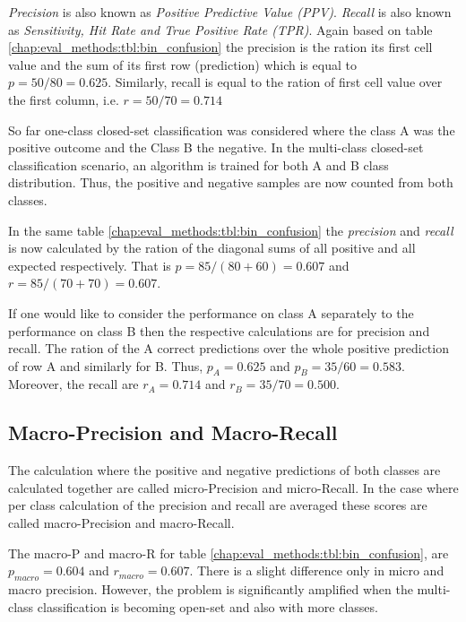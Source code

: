 \textit{Precision} is also known as \textit{Positive Predictive Value (PPV)}. \textit{Recall} is also known as \textit{Sensitivity, Hit Rate and True Positive Rate (TPR)}. Again based on table \ref{chap:eval_methods:tbl:bin_confusion} the precision is the ration its first cell value and the sum of its first row (prediction) which is equal to $p = 50 / 80 = 0.625$. Similarly, recall is equal to the ration of first cell value over the first column, i.e. $r = 50 / 70 = 0.714$

So far one-class closed-set classification was considered where the class A was the positive outcome and the Class B the negative. In the multi-class closed-set classification scenario, an algorithm is trained for both A and B class distribution. Thus, the positive and negative samples are now counted from both classes.

In the same table \ref{chap:eval_methods:tbl:bin_confusion} the \textit{precision} and \textit{recall} is now calculated by the ration of the diagonal sums of all positive and all expected respectively. That is $p = 85 / (80 + 60) = 0.607$ and $r = 85 / (70 + 70) = 0.607$. 

If one would like to consider the performance on class A separately to the performance on class B then the respective calculations are for precision and recall. The ration of the A correct predictions over the whole positive prediction of row A and similarly for B. Thus, $p_{A} = 0.625$ and $p_{B} = 35 / 60 = 0.583$. Moreover, the recall are $r_{A} = 0.714$ and $r_{B} = 35 / 70 = 0.500$.

\subsection{Macro-Precision and Macro-Recall}\label{chap:eval_methods:sec:prf_macro}

The calculation where the positive and negative predictions of both classes are calculated together are called micro-Precision and micro-Recall. In the case where per class calculation of the precision and recall are averaged these scores are called macro-Precision and macro-Recall. 

The macro-P and macro-R for table \ref{chap:eval_methods:tbl:bin_confusion}, are $p_{macro} = 0.604$ and $r_{macro} = 0.607$. There is a slight difference only in micro and macro precision. However, the problem is significantly amplified when the multi-class classification is becoming open-set and also with more classes.

